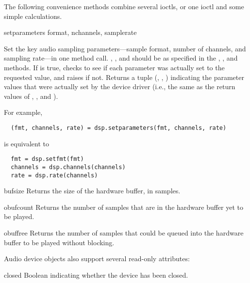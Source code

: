 The following convenience methods combine several ioctls, or one ioctl
and some simple calculations.

\begin{methoddesc}{setparameters}
  {format, nchannels, samplerate }

Set the key audio sampling parameters---sample format, number of
channels, and sampling rate---in one method call.  , 
, and  should be as specified in the
, , and  
methods.  If  is true,  checks to
see if each parameter was actually set to the requested value, and
raises  if not.  Returns a tuple (,
, ) indicating the parameter values that
were actually set by the device driver (i.e., the same as the return
values of , , and ).

For example,
\begin{verbatim}
  (fmt, channels, rate) = dsp.setparameters(fmt, channels, rate)
\end{verbatim}
is equivalent to
\begin{verbatim}
  fmt = dsp.setfmt(fmt)
  channels = dsp.channels(channels)
  rate = dsp.rate(channels)
\end{verbatim}
\end{methoddesc}

\begin{methoddesc}{bufsize}{}
Returns the size of the hardware buffer, in samples.
\end{methoddesc}

\begin{methoddesc}{obufcount}{}
Returns the number of samples that are in the hardware buffer yet to be
played.
\end{methoddesc}

\begin{methoddesc}{obuffree}{}
Returns the number of samples that could be queued into the hardware
buffer to be played without blocking.
\end{methoddesc}

Audio device objects also support several read-only attributes:

\begin{memberdesc}{closed}{}
Boolean indicating whether the device has been closed.
\end{memberdesc}

